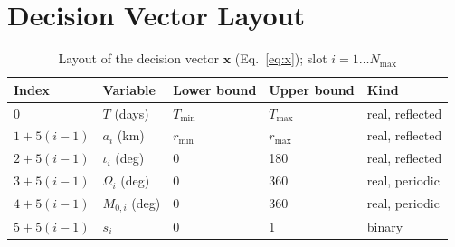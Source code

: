 \chapter{Decision Vector Layout}
\label{app:vector}

\begin{table}[H]
\centering
\caption{Layout of the decision vector $\mathbf{x}$ (Eq.~\ref{eq:x}); slot $i=1\dots N_{\max}$}
\footnotesize
\begin{tabular}{@{}lllll@{}}
\toprule
Index & Variable & Lower bound & Upper bound & Kind \\
\midrule
0 & $T$ (days) & $T_{\min}$ & $T_{\max}$ & real, reflected \\
$1+5(i-1)$ & $a_i$ (km) & $r_{\min}$ & $r_{\max}$ & real, reflected \\
$2+5(i-1)$ & $\iota_i$ (deg) & 0 & 180 & real, reflected \\
$3+5(i-1)$ & $\Omega_i$ (deg) & 0 & 360 & real, periodic \\
$4+5(i-1)$ & $M_{0,i}$ (deg) & 0 & 360 & real, periodic \\
$5+5(i-1)$ & $s_i$ & 0 & 1 & binary \\
\bottomrule
\end{tabular}
\end{table}
